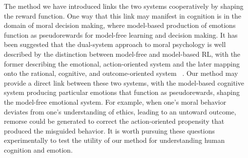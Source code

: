 \documentclass[letterpaper]{article}
\begin{document}
The method we have introduced links the two systems cooperatively by shaping the reward function. One way that this link may manifest in cognition is in the domain of moral decision making, where model-based production of emotions function as pseudorewards for model-free learning and decision making. It has been suggested that the dual-system approach to moral psychology is well described by the distinction between model-free and model-based RL, with the former describing the emotional, action-oriented system and the later mapping onto the rational, cognitive, and outcome-oriented system ~\cite{cushman2013action, crockett2013models}. Our method may provide a direct link between these two systems, with the model-based cognitive system producing particular emotions that function as pseudorewards, shaping the model-free emotional system. For example, when one's moral behavior deviates from one's understanding of ethics, leading to an untoward outcome, remorse could be generated to correct the action-oriented propensity that produced the misguided behavior. It is worth pursuing these questions experimentally to test the utility of our method for understanding human cognition and emotion.

{}

\end{document}
